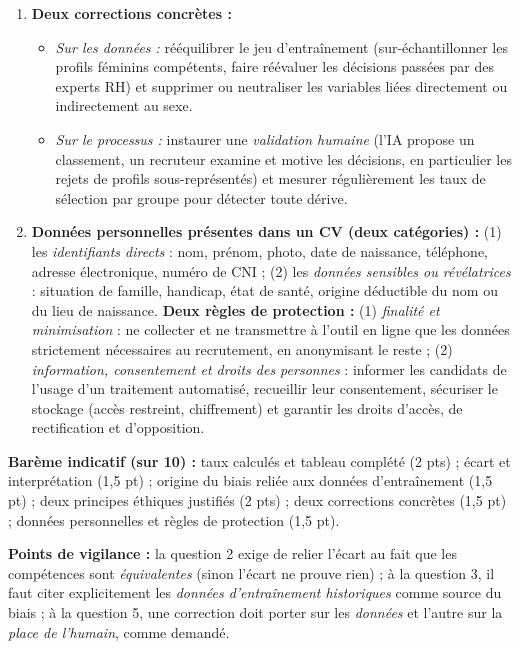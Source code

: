 \documentclass[11pt]{article}
\begin{document}
\begin{corrige}
\begin{enumerate}
\item \textbf{Deux corrections concrètes :}
\begin{itemize}
\item \emph{Sur les données :} rééquilibrer le jeu d'entraînement (sur-échantillonner les profils féminins compétents, faire réévaluer les décisions passées par des experts RH) et supprimer ou neutraliser les variables liées directement ou indirectement au sexe.
\item \emph{Sur le processus :} instaurer une \emph{validation humaine} (l'IA propose un classement, un recruteur examine et motive les décisions, en particulier les rejets de profils sous-représentés) et mesurer régulièrement les taux de sélection par groupe pour détecter toute dérive.
\end{itemize}
\item \textbf{Données personnelles présentes dans un CV (deux catégories) :} (1) les \emph{identifiants directs} : nom, prénom, photo, date de naissance, téléphone, adresse électronique, numéro de CNI ; (2) les \emph{données sensibles ou révélatrices} : situation de famille, handicap, état de santé, origine déductible du nom ou du lieu de naissance. \textbf{Deux règles de protection :} (1) \emph{finalité et minimisation} : ne collecter et ne transmettre à l'outil en ligne que les données strictement nécessaires au recrutement, en anonymisant le reste ; (2) \emph{information, consentement et droits des personnes} : informer les candidats de l'usage d'un traitement automatisé, recueillir leur consentement, sécuriser le stockage (accès restreint, chiffrement) et garantir les droits d'accès, de rectification et d'opposition.
\end{enumerate}

\textbf{Barème indicatif (sur 10) :} taux calculés et tableau complété (2 pts) ; écart et interprétation (1,5 pt) ; origine du biais reliée aux données d'entraînement (1,5 pt) ; deux principes éthiques justifiés (2 pts) ; deux corrections concrètes (1,5 pt) ; données personnelles et règles de protection (1,5 pt).

\textbf{Points de vigilance :} la question 2 exige de relier l'écart au fait que les compétences sont \emph{équivalentes} (sinon l'écart ne prouve rien) ; à la question 3, il faut citer explicitement les \emph{données d'entraînement historiques} comme source du biais ; à la question 5, une correction doit porter sur les \emph{données} et l'autre sur la \emph{place de l'humain}, comme demandé.
\end{corrige}
\end{document}
